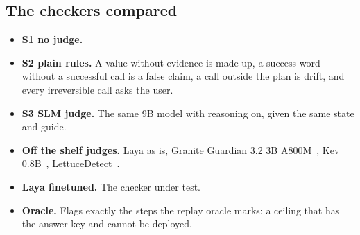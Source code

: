 \documentclass[10pt,a4paper]{article}
\begin{document}
\subsection{The checkers compared}
\begin{itemize}
  \item \textbf{S1 no judge.}
  \item \textbf{S2 plain rules.} A value without evidence is made up, a success word without a successful call is a false claim, a call outside the plan is drift, and every irreversible call asks the user.
  \item \textbf{S3 SLM judge.} The same 9B model with reasoning on, given the same state and guide.
  \item \textbf{Off the shelf judges.} Laya as is, Granite Guardian 3.2 3B A800M~\cite{granite}, Kev 0.8B~\cite{kev}, LettuceDetect~\cite{lettuce}.
  \item \textbf{Laya finetuned.} The checker under test.
  \item \textbf{Oracle.} Flags exactly the steps the replay oracle marks: a ceiling that has the answer key and cannot be deployed.
\end{itemize}
\end{document}
